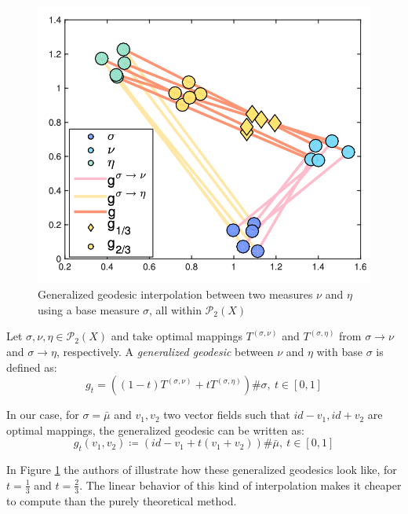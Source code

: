\documentclass{article}
\begin{document}
{

\begin{figure}
    \includegraphics[trim={0 1cm 0 1.5cm},width=\linewidth]{images/generalized_geodesics.png}
    \caption{Generalized geodesic interpolation between two measures $\nu$
    and $\eta$ using a base measure $\sigma$, all within $\mathscr{P}_2(X)$}
    \label{fig:generalized_geodesics}
\end{figure}

Let $\sigma,\nu,\eta\in\mathscr{P}_2(X)$ and take optimal mappings $T^{(\sigma, \nu)}$
and $T^{(\sigma,\eta)}$ from $\sigma\rightarrow\nu$ and $\sigma\rightarrow\eta$, respectively.
A \textit{generalized geodesic} between $\nu$ and $\eta$ with base $\sigma$ is 
defined as:
\[g_t = \left((1-t)T^{(\sigma, \nu)} + tT^{(\sigma, \eta)}\right)\#\sigma,\ t\in[0,1] \]

In our case, for $\sigma = \bar\mu$ and $v_1, v_2$ two vector fields such that
$id-v_1, id+v_2$ are optimal mappings, the generalized geodesic can be written as:
\[g_t(v_1, v_2)\coloneqq \left(id - v_1 + t(v_1+v_2)\right)\#\bar\mu,\ t\in[0,1]  \] 

In Figure \ref{fig:generalized_geodesics} the authors of \cite{seguy2015principal}
illustrate how these generalized geodesics look like, for $t=\frac{1}{3}$ and 
$t = \frac{2}{3}$. The linear behavior of this kind of interpolation makes it 
cheaper to compute than the purely theoretical method.

}
\end{document}
